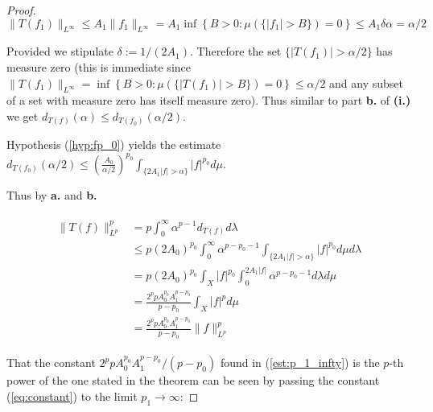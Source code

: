 \begin{proof}
\begin{equation*}
	\|T(f_1)\|_{L^\infty} \leq A_1 \|f_1\|_{L^\infty} = A_1 \inf \left\{B > 0: \mu(\{\vert f_1 \vert > B\}) = 0 \right\} \leq A_1\delta\alpha = \alpha/2
\end{equation*}

Provided we stipulate $\delta := 1/(2A_1)$. Therefore the set $\{\vert T(f_1) \vert > \alpha/2\}$ has measure zero (this is immediate since $\|T(f_1)\|_{L^\infty} =  \inf \left\{B > 0: \mu(\{\vert T(f_1) \vert > B\}) = 0 \right\} \leq \alpha/2 $ and any subset of a set with measure zero has itself measure zero). Thus similar to part \textbf{b.} of \textbf{(i.)} we get $d_{T(f)}(\alpha) \leq d_{T(f_0)}(\alpha/2)$.

	Hypothesis (\ref{hyp:fp_0}) yields the estimate $\displaystyle d_{T(f_0)}(\alpha/2) \leq \left(\frac{A_0}{\alpha/2}\right)^{p_0} \int_{\{2A_1\vert f \vert > \alpha\}} \vert f \vert^{p_0}d\mu$.

	Thus by \textbf{a.} and \textbf{b.}

	\begin{gather}
		\begin{aligned}
			\|T(f)\|_{L^p}^p &= p \int_0^{\infty} \alpha^{p-1}d_{T(f)} d\lambda\\
			&\leq p (2A_0)^{p_0} \int_0^{\infty} \alpha^{p-p_0-1} \int_{\{2A_1\vert f \vert > \alpha\}} \vert f \vert^{p_0}d\mu d\lambda\\
			&= p(2A_0)^{p_0} \int_X \vert f\vert^{p_0} \int_0^{2A_1\vert f \vert} \alpha^{p - p_0 - 1}d\lambda d\mu\\
			&= \frac{2^ppA_0^{p_0}A_1^{p - p_0}}{p - p_0} \int_X \vert f\vert^{p} d\mu\\
			&= \frac{2^ppA_0^{p_0}A_1^{p - p_0}}{p - p_0} \|f\|_{L^p}^p
			\label{est:p_1_infty}
		\end{aligned}
	\end{gather}

	That the constant $2^ppA_0^{p_0}A_1^{p - p_0}/(p - p_0)$ found in (\ref{est:p_1_infty}) is the $p$-th power of the one stated in the theorem can be seen by passing the constant (\ref{eq:constant}) to the limit $p_1 \rightarrow \infty$:


\end{proof}
